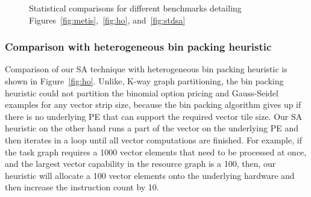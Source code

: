 \begin{figure}[t!]
{\begin{tabular}{|c|c|c|c|c|c|}
    \end{tabular}
    \label{tab:3}
  } 
  \caption{Statistical comparisons for different benchmarks detailing
    Figures~\ref{fig:metis},~\ref{fig:ho}, and~\ref{fig:stdsa}}
  \label{fig:8}
\end{figure}

\subsubsection{Comparison with heterogeneous bin packing heuristic}
\label{sec:comp-with-heter}

Comparison of our SA technique with heterogeneous bin packing heuristic
is shown in Figure~\ref{fig:ho}. Unlike, K-way graph partitioning, the
bin packing heuristic could not partition the binomial option pricing
and Gauss-Seidel examples for any vector strip size, because the bin
packing algorithm gives up if there is no underlying PE that can support
the required vector tile size. Our SA heuristic on the other hand runs a
part of the vector on the underlying PE and then iterates in a loop
until all vector computations are finished. For example, if the task
graph requires a 1000 vector elements that need to be processed at once,
and the largest vector capability in the resource graph is a 100, then,
our heuristic will allocate a 100 vector elements onto the underlying
hardware and then increase the instruction count by 10.

